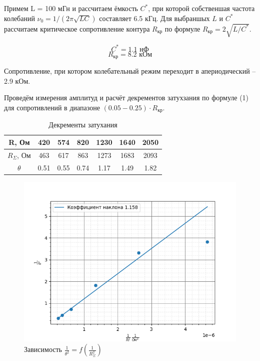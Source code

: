 \documentclass[a4paper,12 pt]{article}
\begin{document}
Примем L = 100 мГн и рассчитаем ёмкость $C^*$, при которой собственшая частота колебаний $\nu_0=1 /(2 \pi \sqrt{L C})$ составляет 6.5 кГц. Для выбраншых $L$ и $C^*$ рассчитаем критическое сопротивление контура $R_{\text{кр}}$ по формуле $R_{\text{кр}}=2 \sqrt{L / C^*}$.

\[C^* = 1.1 \text{ нФ}\]
\[R_{\text{кр}} = 8.2 \text{ кОм}\]

Сопротивление, при котором колебательный режим переходит в апериодический -- 2.9 кОм.

Проведём измерения амплитуд и расчёт декрементов затухзания по формуле (1) для сопротивлений в диапазоне $(0.05-0.25)\cdot R_{\text{кр}}$.

\begin{table}[H]
    \centering
    \begin{tabular}{|c|c|c|c|c|c|c|}
    \hline
         R, Ом & 420 & 574 & 820 & 1230 & 1640 & 2050 \\
         \hline
         $R_{\Sigma}$, Ом & 463 & 617 & 863 & 1273 & 1683 & 2093 \\
         \hline
         $\theta$ & 0.51 & 0.55 & 0.74 & 1.17 & 1.49 & 1.82 \\
         \hline
    \end{tabular}
    \caption{Декременты затухания}
\end{table}


\begin{figure}[H]
    \centering
    \includegraphics[scale =0.8]{декременты.png}
    \caption{Зависимость $\frac{1}{\theta^2} = f(\frac{1}{R_{\Sigma}^2})$}
\end{figure}
\end{document}
